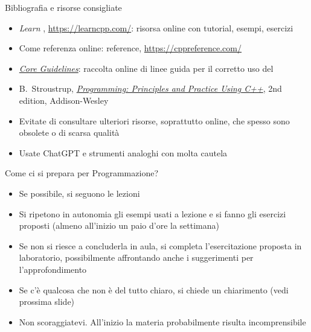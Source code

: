 \begin{frame}{Bibliografia e risorse consigliate}

  \begin{itemize}

  \item \textit{Learn \Cpp{}}, \url{https://learncpp.com/}: risorsa online con
    tutorial, esempi, esercizi

  \item Come referenza online: \Cpp{} reference, \url{https://cppreference.com/}

  \item
    \href{https://isocpp.github.io/CppCoreGuidelines/CppCoreGuidelines}{\textit{\Cpp{}
        Core Guidelines}}: raccolta online di linee guida per il corretto uso
    del \Cpp{}

  \item B.~Stroustrup,
    \href{https://stroustrup.com/programming.html}{\textit{Programming:
        Principles and Practice Using C++}}, 2nd edition, Addison-Wesley

  \end{itemize}

  \begin{itemize}
  \item Evitate di consultare ulteriori risorse, soprattutto online, che spesso
    sono obsolete o di scarsa qualità
  \item Usate ChatGPT e strumenti analoghi con molta cautela
  \end{itemize}

\end{frame}

\begin{frame}{Come ci si prepara per Programmazione?}

  \begin{itemize}
  \item Se possibile, si seguono le lezioni
  \item Si ripetono in autonomia gli esempi usati a lezione e si fanno gli
    esercizi proposti (almeno all'inizio un paio d'ore la settimana)
  \item Se non si riesce a concluderla in aula, si completa l'esercitazione
    proposta in laboratorio, possibilmente affrontando anche i suggerimenti per
    l'approfondimento
  \item Se c'è qualcosa che non è del tutto chiaro, si chiede un chiarimento
    (vedi prossima slide)
  \item Non scoraggiatevi. All'inizio la materia probabilmente risulta
    incomprensibile
  \end{itemize}

\end{frame}

